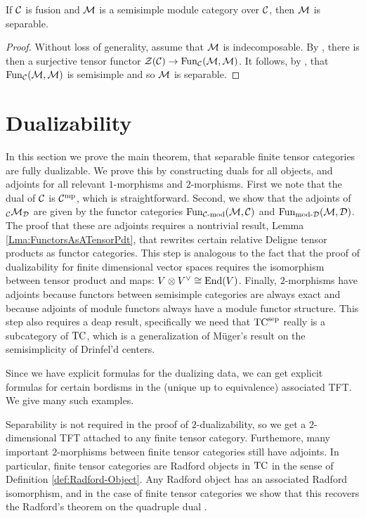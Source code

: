 \documentclass{amsart}
\begin{document}
\begin{theorem} \label{thm:SSModuleCatsAreSep}
If $\mathcal C$ is fusion and $\mathcal M$ is a semisimple module category over $\mathcal C$, then $\mathcal M$ is separable.
\end{theorem}
\begin{proof}
Without loss of generality, assume that $\mathcal M$ is indecomposable.  By \cite{???}, there is then a surjective tensor functor $\mathcal Z(\mathcal C) \rightarrow \operatorname{Fun}_\mathcal C(\mathcal M, \mathcal M)$.  It follows, by \cite{???}, that $\operatorname{Fun}_\mathcal C(\mathcal M, \mathcal M)$ is semisimple and so $\mathcal M$ is separable.
\end{proof}


\section{Dualizability} \label{sec:dualfusion}

In this section we prove the main theorem, that separable finite tensor categories are fully dualizable.  We prove this by constructing duals for all objects, and adjoints for all relevant $1$-morphisms and $2$-morphisms.  First we note that the dual of $\mathcal C$ is $\mathcal C^{\mathrm{mp}}$, which is straightforward.  Second, we show that the adjoints of ${}_\mathcal C \mathcal M_\mathcal D$ are given by the functor categories $\operatorname{Fun}_{{\mathcal C\text{-mod}}}(\mathcal M, \mathcal C)$ and $\operatorname{Fun}_{\text{mod-}\mathcal D}(\mathcal M, \mathcal D)$.  The proof that these are adjoints requires a nontrivial result, Lemma \ref{Lma:FunctorsAsATensorPdt}, that rewrites certain relative Deligne tensor products as functor categories.  This step is analogous to the fact that the proof of dualizability for finite dimensional vector spaces requires the isomorphism between tensor product and maps: $V \otimes V^\vee \cong \operatorname{End}(V)$.  Finally, $2$-morphisms have adjoints because functors between semisimple categories are always exact and because adjoints of module functors always have a module functor structure.  This step also requires a deap result, specifically we need that ${\mathrm{TC}^{\text{sep}}}$ really is a subcategory of $\mathrm{TC}$, which is a generalization of M\"uger's result on the semisimplicity of Drinfel'd centers.

Since we have explicit formulas for the dualizing data, we can get explicit formulas for certain bordisms in the (unique up to equivalence) associated TFT.  We give many such examples.

Separability is not required in the proof of $2$-dualizability, so we get a $2$-dimensional TFT attached to any finite tensor category.  Furthemore, many important $2$-morphisms between finite tensor categories still have adjoints.  In particular, finite tensor categories are Radford objects in $\mathrm{TC}$ in the sense of Definition \ref{def:Radford-Object}.  Any Radford object has an associated Radford isomorphism, and in the case of finite tensor categories we show that this recovers the Radford's theorem on the quadruple dual \cite{MR0407069, MR2097289}.
\end{document}
